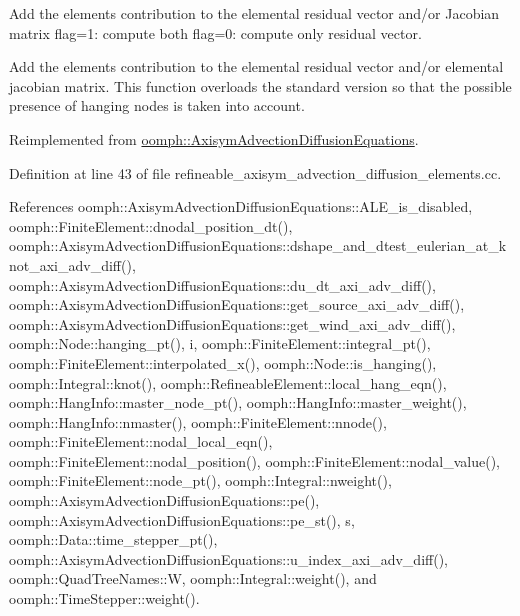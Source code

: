 Add the element\textquotesingle{}s contribution to the elemental residual vector and/or Jacobian matrix flag=1\+: compute both flag=0\+: compute only residual vector. 

Add the element\textquotesingle{}s contribution to the elemental residual vector and/or elemental jacobian matrix. This function overloads the standard version so that the possible presence of hanging nodes is taken into account. 

Reimplemented from \hyperlink{classoomph_1_1AxisymAdvectionDiffusionEquations_a19bf92fed341de2d09b444b3ab71096e}{oomph\+::\+Axisym\+Advection\+Diffusion\+Equations}.



Definition at line 43 of file refineable\+\_\+axisym\+\_\+advection\+\_\+diffusion\+\_\+elements.\+cc.



References oomph\+::\+Axisym\+Advection\+Diffusion\+Equations\+::\+A\+L\+E\+\_\+is\+\_\+disabled, oomph\+::\+Finite\+Element\+::dnodal\+\_\+position\+\_\+dt(), oomph\+::\+Axisym\+Advection\+Diffusion\+Equations\+::dshape\+\_\+and\+\_\+dtest\+\_\+eulerian\+\_\+at\+\_\+knot\+\_\+axi\+\_\+adv\+\_\+diff(), oomph\+::\+Axisym\+Advection\+Diffusion\+Equations\+::du\+\_\+dt\+\_\+axi\+\_\+adv\+\_\+diff(), oomph\+::\+Axisym\+Advection\+Diffusion\+Equations\+::get\+\_\+source\+\_\+axi\+\_\+adv\+\_\+diff(), oomph\+::\+Axisym\+Advection\+Diffusion\+Equations\+::get\+\_\+wind\+\_\+axi\+\_\+adv\+\_\+diff(), oomph\+::\+Node\+::hanging\+\_\+pt(), i, oomph\+::\+Finite\+Element\+::integral\+\_\+pt(), oomph\+::\+Finite\+Element\+::interpolated\+\_\+x(), oomph\+::\+Node\+::is\+\_\+hanging(), oomph\+::\+Integral\+::knot(), oomph\+::\+Refineable\+Element\+::local\+\_\+hang\+\_\+eqn(), oomph\+::\+Hang\+Info\+::master\+\_\+node\+\_\+pt(), oomph\+::\+Hang\+Info\+::master\+\_\+weight(), oomph\+::\+Hang\+Info\+::nmaster(), oomph\+::\+Finite\+Element\+::nnode(), oomph\+::\+Finite\+Element\+::nodal\+\_\+local\+\_\+eqn(), oomph\+::\+Finite\+Element\+::nodal\+\_\+position(), oomph\+::\+Finite\+Element\+::nodal\+\_\+value(), oomph\+::\+Finite\+Element\+::node\+\_\+pt(), oomph\+::\+Integral\+::nweight(), oomph\+::\+Axisym\+Advection\+Diffusion\+Equations\+::pe(), oomph\+::\+Axisym\+Advection\+Diffusion\+Equations\+::pe\+\_\+st(), s, oomph\+::\+Data\+::time\+\_\+stepper\+\_\+pt(), oomph\+::\+Axisym\+Advection\+Diffusion\+Equations\+::u\+\_\+index\+\_\+axi\+\_\+adv\+\_\+diff(), oomph\+::\+Quad\+Tree\+Names\+::W, oomph\+::\+Integral\+::weight(), and oomph\+::\+Time\+Stepper\+::weight().



